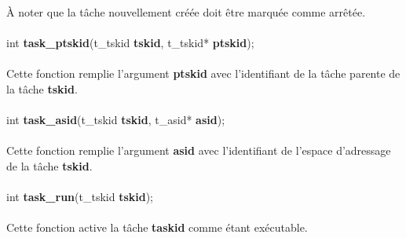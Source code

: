 \documentclass[10pt,a4wide]{article}
\begin{document}
\`A noter que la t\^ache nouvellement cr\'e\'ee doit \^etre marqu\'ee comme
arr\^et\'ee.

\paragraph{}

\hspace{1.5cm}int \textbf{task\_ptskid}(t\_tskid \textbf{tskid},
                                        t\_tskid* \textbf{ptskid});

\paragraph{}

Cette fonction remplie l'argument \textbf{ptskid} avec l'identifiant de
la t\^ache parente de la t\^ache \textbf{tskid}.

\paragraph{}

\hspace{1.5cm}int \textbf{task\_asid}(t\_tskid \textbf{tskid},
                                      t\_asid* \textbf{asid});

\paragraph{}

Cette fonction remplie l'argument \textbf{asid} avec l'identifiant de
l'espace d'adressage de la t\^ache \textbf{tskid}.

\paragraph{}

\hspace{1.5cm}int \textbf{task\_run}(t\_tskid \textbf{tskid});

\paragraph{}

Cette fonction active la t\^ache \textbf{taskid} comme \'etant ex\'ecutable.

\paragraph{}
\end{document}
